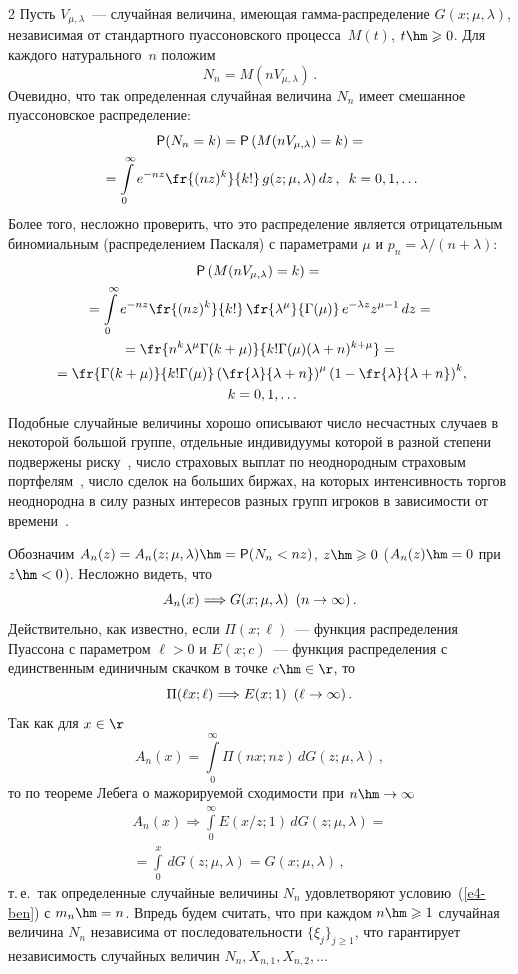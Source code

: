 \begin{multicols}{2}
Пусть $V_{\mu,\lambda}$~--- случайная величина, имеющая
гам\-ма-рас\-пре\-де\-ле\-ние $G(x;\mu,\lambda)$, независимая от стандартного
пуассоновского процесса~$M(t)$, $t\hm\geqslant0$. Для каждого натурального~$n$ положим
$$
N_n=M(nV_{\mu,\lambda})\,.
$$
Очевидно, что так определенная случайная величина $N_n$ имеет
смешанное пуассоновское распределение:
\begin{multline*}
{\sf P}(N_n=k)={\sf P}\left(M(nV_{\mu,\lambda})=k\right)=\\
{}=
\int\limits_0^{\infty}e^{-nz}\fr{(nz)^k}{k!}\,g(z;\mu,\lambda)\,dz\,,\enskip
k=0,1,\ldots
\end{multline*}
Более того, несложно проверить, что это распределение является
отрицательным биномиальным (распределением Паскаля) с параметрами
$\mu$ и $p_n={\lambda}/(n+\lambda)$:
\begin{multline}
{\sf P}\left(M(nV_{\mu,\lambda})=k\right)={}\\
{}=\int\limits_0^{\infty}e^{-nz}
\fr{(nz)^k}{k!}\,\fr{\lambda^{\mu}}{\Gamma(\mu)}\,e^{-\lambda z}z^{\mu-1}\,dz={}\\
{}=
\fr{n^k\lambda^{\mu}\Gamma(k+\mu)}{k!\Gamma(\mu)(\lambda+n)^{k+\mu}}={}\\
{}
=\fr{\Gamma(k+\mu)}{k!\Gamma(\mu)}\left(\fr{\lambda}{\lambda+n}\right)^{\mu}
\left(1-\fr{\lambda}{\lambda+n}\right)^k\!,\\ 
k=0,1,\ldots\!\!
\label{e5-ben}
\end{multline}
Подобные случайные величины хорошо описывают число несчастных
случаев в некоторой большой группе, отдельные индивидуумы которой в
разной степени подвержены риску~\cite{GreenwoodYule1920}, число
страховых выплат по неоднородным страховым портфелям~\cite{KorolevBeningShorgin2011}, 
чис\-ло сделок на больших биржах, на
которых интенсивность торгов неоднородна в силу разных интересов
разных групп игроков в зависимости от времени~\cite{Korolev2011}.

Обозначим $A_n(z)=A_n(z;\mu,\lambda)\hm={\sf P}(N_n<nz)$, $z\hm\geqslant0$
($A_n(z)\hm=0$ при $z\hm<0$). Несложно видеть, что
$$
A_n(x)\Longrightarrow G(x;\mu,\lambda)\enskip (n\to\infty)\,.
$$
Действительно, как известно, если $\Pi(x;\ell)$~--- функция
распределения Пуассона с параметром $\ell>0$ и $E(x;c)$~--- функция
распределения с единственным единичным скачком в точке $c\hm\in\r$, то
$$
\Pi(\ell x;\ell)\Longrightarrow E(x;1)\enskip (\ell\to\infty)\,.
$$
Так как для $x\in\r$
$$
A_n(x)=\int\limits_{0}^{\infty}\Pi(n x; n z)\,dG(z;\mu,\lambda)\,,
$$
то по теореме Лебега о мажорируемой сходимости при $n\hm\to\infty$
\begin{multline*}
A_n(x)\Longrightarrow\int\limits_{0}^{\infty}E(x/z;1)\,dG(z;\mu,\lambda)={}\\
{}=
\int\limits_{0}^{x}\,dG(z;\mu,\lambda)=G(x;\mu,\lambda)\,,
\end{multline*}
т.\,е.\ так определенные случайные величины $N_n$ удов\-ле\-тво\-ря\-ют
условию~(\ref{e4-ben}) с $m_n\hm=n$. Впредь будем считать, что при каждом $n\hm\geqslant1$
случайная величина $N_n$ независима от последовательности
$\{\xi_j\}_{j\geqslant1}$, что гарантирует независимость случайных величин
$N_n,X_{n,1},X_{n,2},\ldots$


\end{multicols}
